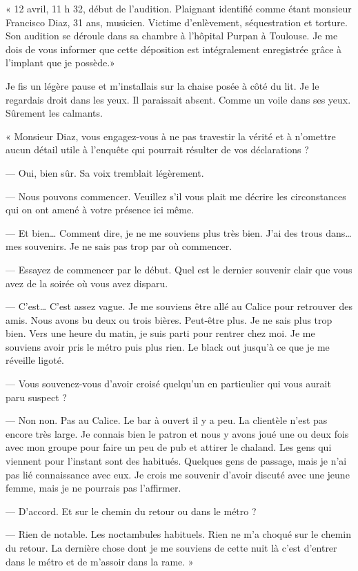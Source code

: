« 12 avril, 11 h 32, début de l'audition. Plaignant identifié comme étant monsieur Francisco Diaz, 31 ans, musicien.
Victime d'enlèvement, séquestration et torture. Son audition se déroule dans sa chambre à l'hôpital Purpan à Toulouse. 
Je me dois de vous informer que cette déposition est intégralement enregistrée grâce à l'implant que je possède.»

Je fis un légère pause et m'installais sur la chaise posée à côté du lit. Je le regardais droit dans les yeux. Il
paraissait absent. Comme un voile dans ses yeux. Sûrement les calmants.

« Monsieur Diaz, vous engagez-vous à ne pas travestir la vérité et à n'omettre aucun détail utile à l'enquête qui
pourrait résulter de vos déclarations ?

— Oui, bien sûr. Sa voix tremblait légèrement.

— Nous pouvons commencer. Veuillez s'il vous plait me décrire les circonstances qui on ont amené à votre présence ici
même.

— Et bien… Comment dire, je ne me souviens plus très bien. J'ai des trous dans… mes souvenirs. Je ne sais pas trop par
où commencer.

— Essayez de commencer par le début. Quel est le dernier souvenir clair que vous avez de la soirée où vous avez disparu.

— C'est… C'est assez vague. Je me souviens être allé au Calice pour retrouver des amis. Nous avons bu deux ou trois
bières. Peut-être plus. Je ne sais plus trop bien. Vers une heure du matin, je suis parti pour rentrer chez moi. Je me
souviens avoir pris le métro puis plus rien. Le black out jusqu'à ce que je me réveille ligoté.

— Vous souvenez-vous d'avoir croisé quelqu'un en particulier qui vous aurait paru suspect ?

— Non non. Pas au Calice. Le bar à ouvert il y a peu. La clientèle n'est pas encore très large. Je connais bien le
patron et nous y avons joué une ou deux fois avec mon groupe pour faire un peu de pub et attirer le chaland. Les gens 
qui viennent pour l'instant sont des habitués. Quelques gens de passage, mais je n'ai pas lié connaissance avec eux. Je 
crois me souvenir d'avoir discuté avec une jeune femme, mais je ne pourrais pas l'affirmer.

— D'accord. Et sur le chemin du retour ou dans le métro ?

— Rien de notable. Les noctambules habituels. Rien ne m'a choqué sur le chemin du retour. La dernière chose dont je me 
souviens de cette nuit là c'est d'entrer dans le métro et de m'assoir dans la rame. »

